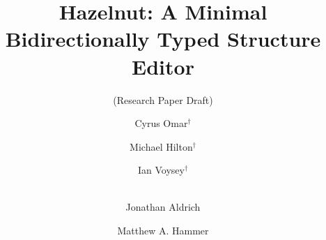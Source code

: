 \documentclass{llncs}
\begin{document}
%
\frontmatter          %

\mainmatter              %
%
\title{Hazelnut: A Minimal Bidirectionally Typed Structure Editor}
\subtitle{(Research Paper Draft)}
%
%
\author{Cyrus Omar$^\dagger$ \and Michael Hilton$^\dagger$ \and
Ian Voysey$^\dagger$ \and \\Jonathan Aldrich \and Matthew A. Hammer}
%
%
%
\end{document}
